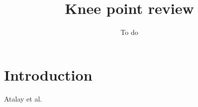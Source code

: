 \documentclass{article}
\title{Knee point review}
\author{To do}
\date{}
\begin{document}
\maketitle

\section{Introduction}

Atalay et al.~\cite{atalay_theory_2020}



\end{document}
